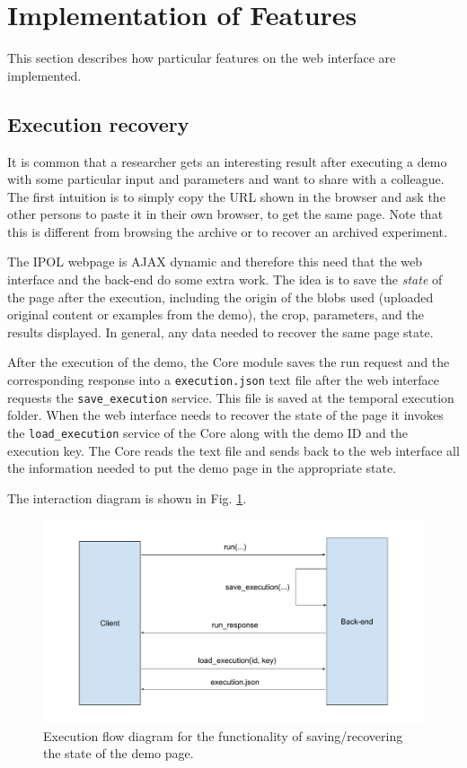 \section{Implementation of Features}
This section describes how particular features on the web interface are implemented.

%
\subsection{Execution recovery}
It is common that a researcher gets an interesting result after executing a demo with some particular input and parameters and want to share with a colleague. The first intuition is to simply copy the URL shown in the browser and ask the other persons to paste it in their own browser, to get the same page. Note that this is different from browsing the archive or to recover an archived experiment.

The IPOL webpage is AJAX dynamic and therefore this need that the web interface and the back-end do some extra work. The idea is to save the \emph{state} of the page after the execution, including the origin of the blobs used (uploaded original content or examples from the demo), the crop, parameters, and the results displayed. In general, any data needed to recover the same page state.

After the execution of the demo, the Core module saves the run request and the corresponding response into a {\tt execution.json} text file after the web interface requests the {\tt save\_execution} service. This file is saved at the temporal execution folder.
%
When the web interface needs to recover the state of the page it invokes the {\tt load\_execution} service of the Core along with the demo ID and the execution key. The Core reads the text file and sends back to the web interface all the information needed to put the demo page in the appropriate state.

The interaction diagram is shown in Fig. \ref{fig:execution_flow}.

\begin{figure}[h]
	\centering
	\includegraphics[width=\textwidth]{images/execution_flow}
	\caption{Execution flow diagram for the functionality of saving/recovering the state of the demo page.} 
	\label{fig:execution_flow}
\end{figure}

